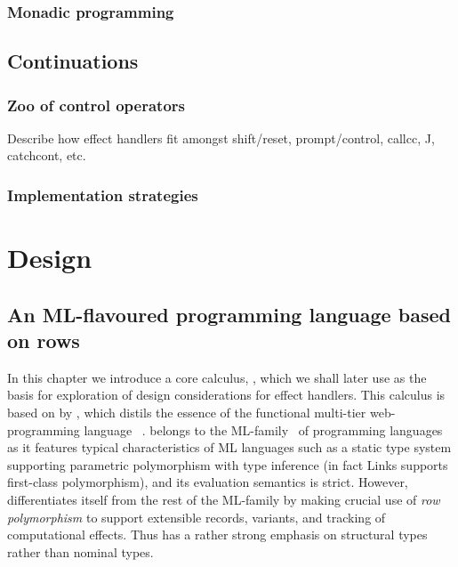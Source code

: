 \documentclass[12pt,phd,lfcs,twoside,openright,logo,leftchapter,normalheadings]{infthesis}
\theoremstyle{plain}
\theoremstyle{definition}
\begin{document}
\section{Monadic programming}

\chapter{Continuations}
\label{ch:continuations}

\section{Zoo of control operators}
Describe how effect handlers fit amongst shift/reset, prompt/control,
callcc, J, catchcont, etc.

\section{Implementation strategies}


\part{Design}

\chapter{An ML-flavoured programming language based on rows}
\label{ch:base-language}

In this chapter we introduce a core calculus, \BCalc{}, which we shall
later use as the basis for exploration of design considerations for
effect handlers. This calculus is based on \CoreLinks{} by
\citet{LindleyC12}, which distils the essence of the functional
multi-tier web-programming language
\Links{}~\cite{CooperLWY06}. \Links{} belongs to the
ML-family~\cite{MilnerTHM97} of programming languages as it features
typical characteristics of ML languages such as a static type system
supporting parametric polymorphism with type inference (in fact Links
supports first-class polymorphism), and its evaluation semantics is
strict. However, \Links{} differentiates itself from the rest of the
ML-family by making crucial use of \emph{row polymorphism} to support
extensible records, variants, and tracking of computational
effects. Thus \Links{} has a rather strong emphasis on structural
types rather than nominal types.
\end{document}
